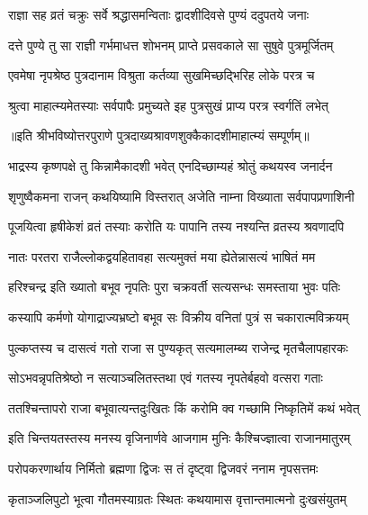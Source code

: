 \twolineshloka
{राज्ञा सह व्रतं चक्रुः सर्वे श्रद्धासमन्विताः}
{द्वादशीदिवसे पुण्यं ददुपतये जनाः} %

\twolineshloka
{दत्ते पुण्ये तु सा राज्ञी गर्भमाधत्त शोभनम्}
{प्राप्ते प्रसवकाले सा सुषुवे पुत्रमूर्जितम्} %

\twolineshloka
{एवमेषा नृपश्रेष्ठ पुत्रदानाम विश्रुता}
{कर्तव्या सुखमिच्छद्भिरिह लोके परत्र च} %

\twolineshloka
{श्रुत्वा माहात्म्यमेतस्याः सर्वपापैः प्रमुच्यते}
{इह पुत्रसुखं प्राप्य परत्र स्वर्गतिं लभेत्} %

॥इति श्रीभविष्योत्तरपुराणे पुत्रदाख्यश्रावणशुक्कैकादशीमाहात्म्यं सम्पूर्णम्॥



\twolineshloka
{भाद्रस्य कृष्णपक्षे तु किन्नामैकादशी भवेत्}
{एनदिच्छाम्यहं श्रोतुं कथयस्व जनार्दन} %


\twolineshloka
{शृणुष्वैकमना राजन् कथयिष्यामि विस्तरात्}
{अजेति नाम्ना विख्याता सर्वपापप्रणाशिनी} %

\twolineshloka
{पूजयित्वा हृषीकेशं व्रतं तस्याः करोति यः}
{पापानि तस्य नश्यन्ति व्रतस्य श्रवणादपि} %

\twolineshloka
{नातः परतरा राजैल्लोकद्वयहितावहा}
{सत्यमुक्तं मया ह्येतेन्नासत्यं भाषितं मम} %

\twolineshloka
{हरिश्चन्द्र इति ख्यातो बभूव नृपतिः पुरा}
{चक्रवर्ती सत्यसन्धः समस्ताया भुवः पतिः} %

\twolineshloka
{कस्यापि कर्मणो योगाद्राज्यभ्रष्टो बभूव सः}
{विक्रीय वनितां पुत्रं स चकारात्मविक्रयम्} %

\twolineshloka
{पुल्कप्तस्य च दासत्वं गतो राजा स पुण्यकृत्}
{सत्यमालम्ब्य राजेन्द्र मृतचैलापहारकः} %

\twolineshloka
{सोऽभवन्नृपतिश्रेष्ठो न सत्याञ्चलितस्तथा}
{एवं गतस्य नृपतेर्बहवो वत्सरा गताः} %

\twolineshloka
{ततश्चिन्तापरो राजा बभूवात्यन्तदुःखितः}
{किं करोमि क्व गच्छामि निष्कृतिमें कथं भवेत्} %

\twolineshloka
{इति चिन्तयतस्तस्य मनस्य वृजिनार्णवे}
{आजगाम मुनिः कैश्चिज्ज्ञात्वा राजानमातुरम्} %

\twolineshloka
{परोपकरणार्थाय निर्मितो ब्रह्मणा द्विजः}
{स तं दृष्ट्वा द्विजवरं ननाम नृपसत्तमः} %

\twolineshloka
{कृताञ्जलिपुटो भूत्वा गौतमस्याग्रतः स्थितः}
{कथयामास वृत्तान्तमात्मनो दुःखसंयुतम्} %

